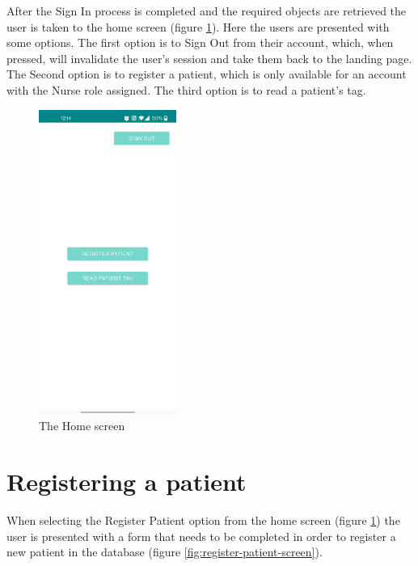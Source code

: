After the Sign In process is completed and the required objects are retrieved the user is taken to the home screen (figure \ref{fig:home-screen}). Here the users are presented with some options. The first option is to Sign Out from their account, which, when pressed, will invalidate the user's session and take them back to the landing page. The Second option is to register a patient, which is only available for an account with the Nurse role assigned. The third option is to read a patient's tag.

\begin{figure}
\centering
\includegraphics[width=0.4\textwidth]{figures/home_page_screen.png}
\caption{The Home screen}
\label{fig:home-screen}
\end{figure}

\section{Registering a patient}
\label{sec:ch5sec3}

\par When selecting the Register Patient option from the home screen (figure \ref{fig:home-screen}) the user is presented with a form that needs to be completed in order to register a new patient in the database (figure \ref{fig:register-patient-screen}).


